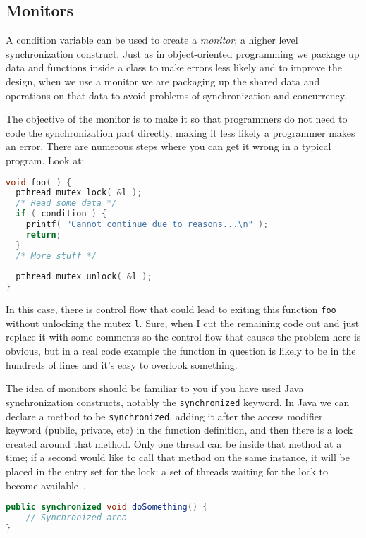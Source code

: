 \subsection*{Monitors}
A condition variable can be used to create a \textit{monitor}, a higher level synchronization construct. Just as in object-oriented programming we package up data and functions inside a class to make errors less likely and to improve the design, when we use a monitor we are packaging up the shared data and operations on that data to avoid problems of synchronization and concurrency.

The objective of the monitor is to make it so that programmers do not need to code the synchronization part directly, making it less likely a programmer makes an error. There are numerous steps where you can get it wrong in a typical program. Look at:

\begin{lstlisting}[language=C]
void foo( ) {
  pthread_mutex_lock( &l );
  /* Read some data */
  if ( condition ) {
    printf( "Cannot continue due to reasons...\n" );
    return;
  }
  /* More stuff */
   
  pthread_mutex_unlock( &l );
}
\end{lstlisting}

In this case, there is control flow that could lead to exiting this function \texttt{foo} without unlocking the mutex \texttt{l}. Sure, when I cut the remaining code out and just replace it with some comments so the control flow that causes the problem here is obvious, but in a real code example the function in question is likely to be in the hundreds of lines and it's easy to overlook something. 

The idea of monitors should be familiar to you if you have used Java synchronization constructs, notably the \texttt{synchronized} keyword. In Java we can declare a method to be \texttt{synchronized}, adding it after the access modifier keyword (public, private, etc) in the function definition, and then there is a lock created around that method. Only one thread can be inside that method at a time; if a second would like to call that method on the same instance, it will be placed in the entry set for the lock: a set of threads waiting for the lock to become available~\cite{osc}. 

\begin{lstlisting}[language=Java]
public synchronized void doSomething() {
    // Synchronized area
}
\end{lstlisting}


